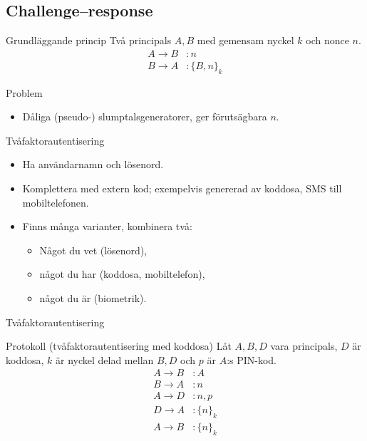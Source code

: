 \documentclass{beamer}
\newcommand{\encrypt}[2]{\{#1\}_{#2}}
\begin{document}
\subsection{Challenge--response}

\begin{frame}{\insertsubsectionhead}
  \begin{block}{Grundläggande princip}
    Två principals \(A, B\) med gemensam nyckel \(k\) och nonce \(n\).
    \begin{align*}
      A\to B &\colon n \\
      B\to A &\colon \encrypt{B, n}{k}
    \end{align*}
  \end{block}
  \begin{block}{Problem}
    \begin{itemize}
      \item Dåliga (pseudo-) slumptalsgeneratorer, ger förutsägbara \(n\).
    \end{itemize}
  \end{block}
\end{frame}

\begin{frame}{\insertsubsectionhead}{Tvåfaktorautentisering}
  \begin{itemize}
    \item Ha användarnamn och lösenord.
    \item Komplettera med extern kod; exempelvis genererad av koddosa, SMS till 
      mobiltelefonen.
    \item Finns många varianter, kombinera två:
      \begin{itemize}
        \item Något du vet (lösenord),
        \item något du har (koddosa, mobiltelefon),
        \item något du är (biometrik).
      \end{itemize}
  \end{itemize}
\end{frame}

\begin{frame}{\insertsubsectionhead}{Tvåfaktorautentisering}
  \begin{block}{Protokoll (tvåfaktorautentisering med koddosa)}
    Låt \(A, B, D\) vara principals, \(D\) är koddosa, \(k\) är nyckel delad 
    mellan \(B, D\) och \(p\) är \(A\):s PIN-kod.
    \begin{align*}
      A\to B &\colon A \\
      B\to A &\colon n \\
      A\to D &\colon n, p \\
      D\to A &\colon \encrypt{n}{k} \\
      A\to B &\colon \encrypt{n}{k}
    \end{align*}
  \end{block}
\end{frame}
\end{document}
